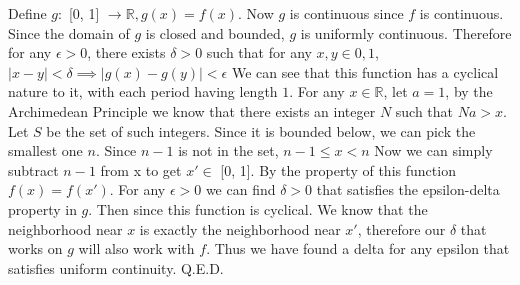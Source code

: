 \documentclass[12pt]{article}
\newcommand{\R}{\mathbb{R}}
\begin{document}
Define $g: $ [0, 1] $\to \R, g(x)=f(x)$. Now $g$ is continuous since $f$ is continuous. Since the domain of $g$ is closed and bounded, $g$ is uniformly continuous. Therefore for any $\epsilon > 0$, there exists $\delta > 0$ such that for any $x,y \in 0, 1$, $|x-y|<\delta \implies |g(x)-g(y)|<\epsilon$
\newline
We can see that this function has a cyclical nature to it, with each period having length $1$. For any $x \in \R$, let $a=1$, by the Archimedean Principle we know that there exists an integer $N$ such that $N a > x$. Let $S$ be the set of such integers. Since it is bounded below, we can pick the smallest one $n$.
Since $n-1$ is not in the set, $n-1 \leq x < n$
\newline
Now we can simply subtract $n-1$ from x to get $x' \in $ [0, 1]. By the property of this function $f(x) = f(x')$.
\newline
For any $\epsilon > 0$ we can find $\delta > 0$ that satisfies the epsilon-delta property in $g$. Then since this function is cyclical. We know that the neighborhood near $x$ is exactly the neighborhood near $x'$, therefore our $\delta$ that works on $g$ will also work with $f$.
\newline
Thus we have found a delta for any epsilon that satisfies uniform continuity.
\newline
Q.E.D.
\end{document}
